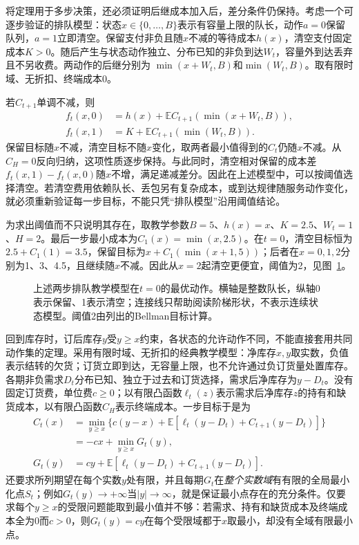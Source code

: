 将定理用于多步决策，还必须证明后继成本加入后，差分条件仍保持。考虑一个可逐步验证的排队模型：状态$x\in\{0,\ldots,B\}$表示有容量上限的队长，动作$a=0$保留队列，$a=1$立即清空。保留支付非负且随$x$不减的等待成本$h(x)$，清空支付固定成本$K>0$。随后产生与状态动作独立、分布已知的非负到达$W_t$，容量外到达丢弃且不另收费。两动作的后继分别为
$\min(x+W_t,B)$和$\min(W_t,B)$。取有限时域、无折扣、终端成本0。

若$C_{t+1}$单调不减，则
\[
 \begin{aligned}
 f_t(x,0)&=h(x)+\mathbb E C_{t+1}(\min(x+W_t,B)),\\
 f_t(x,1)&=K+\mathbb E C_{t+1}(\min(W_t,B)).
 \end{aligned}
 \]
保留目标随$x$不减，清空目标不随$x$变化，取两者最小值得到的$C_t$仍随$x$不减。从$C_H=0$反向归纳，这项性质逐步保持。与此同时，清空相对保留的成本差$f_t(x,1)-f_t(x,0)$随$x$不增，满足递减差分。因此在上述模型中，可以按阈值选择清空。若清空费用依赖队长、丢包另有复杂成本，或到达规律随服务动作变化，就必须重新验证每一步目标，不能只凭“排队模型”沿用阈值结论。

为求出阈值而不只说明其存在，取教学参数$B=5$、$h(x)=x$、$K=2.5$、$W_t=1$、$H=2$。最后一步最小成本为$C_1(x)=\min(x,2.5)$。在$t=0$，清空目标恒为$2.5+C_1(1)=3.5$，保留目标为$x+C_1(\min(x+1,5))$；后者在$x=0,1,2$分别为1、3、4.5，且继续随$x$不减。因此从$x=2$起清空更便宜，阈值为2，见图~\ref{fig:rl-planning-threshold}。

\begin{figure}[htbp]
 \centering
 
 \caption{上述两步排队教学模型在$t=0$的最优动作。横轴是整数队长，纵轴0表示保留、1表示清空；连接线只帮助阅读阶梯形状，不表示连续状态模型。阈值2由列出的Bellman目标计算。}
 \label{fig:rl-planning-threshold}
\end{figure}

回到库存时，订后库存$y$受$y\geq x$约束，各状态的允许动作不同，不能直接套用共同动作集的定理。采用有限时域、无折扣的经典教学模型：净库存$x,y$取实数，负值表示结转的欠货；订货立即到达，无容量上限，也不允许通过负订货量处置库存。各期非负需求$D_t$分布已知、独立于过去和订货选择，需求后净库存为$y-D_t$。没有固定订货费，单位费$c\geq0$；以有限凸函数$\ell_t(z)$表示需求后净库存$z$的持有和缺货成本，以有限凸函数$C_H$表示终端成本。一步目标于是为
\[
 \begin{aligned}
 C_t(x)&=\min_{y\geq x}\{c(y-x)+
       \mathbb E[\ell_t(y-D_t)+C_{t+1}(y-D_t)]\}\\
       &=-cx+\min_{y\geq x}G_t(y),\\
 G_t(y)&=cy+\mathbb E[\ell_t(y-D_t)+C_{t+1}(y-D_t)].
 \end{aligned}
\]
还要求所列期望在每个实数$y$处有限，并且每期$G_t$在\emph{整个实数域}有有限的全局最小化点$S_t$；例如$G_t(y)\to+\infty$当$|y|\to\infty$，就是保证最小点存在的充分条件。仅要求每个$y\geq x$的受限问题能取到最小值并不够：若需求、持有和缺货成本及终端成本全为0而$c>0$，则$G_t(y)=cy$在每个受限域都于$x$取最小，却没有全域有限最小点。

